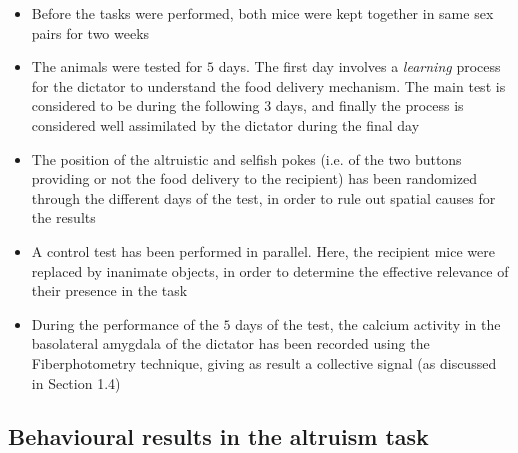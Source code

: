 \documentclass[a4paper]{article}
\begin{document}
\begin{itemize}
	
	\item Before the tasks were performed, both mice were kept together in same sex pairs for two weeks 
	
	\item The animals were tested for $5$ days. The first day involves a \textit{learning} process for the dictator to understand the food delivery mechanism. The main test is considered to be during the following $3$ days, and finally the process is considered well assimilated by the dictator during the final day	
	
	\item The position of the altruistic and selfish pokes (i.e. of the two buttons providing or not the food delivery to the recipient) has been randomized through the different days of the test, in order to rule out spatial causes for the results
	
	\item A control test has been performed in parallel. Here, the recipient mice were replaced by inanimate objects, in order to determine the effective relevance of their presence in the task
	
	\item During the performance of the $5$ days of the test, the calcium activity in the basolateral amygdala of the dictator has been recorded using the Fiberphotometry technique, giving as result a collective signal (as discussed in Section 1.4)
	
\end{itemize}



\subsection{Behavioural results in the altruism task}
\end{document}
